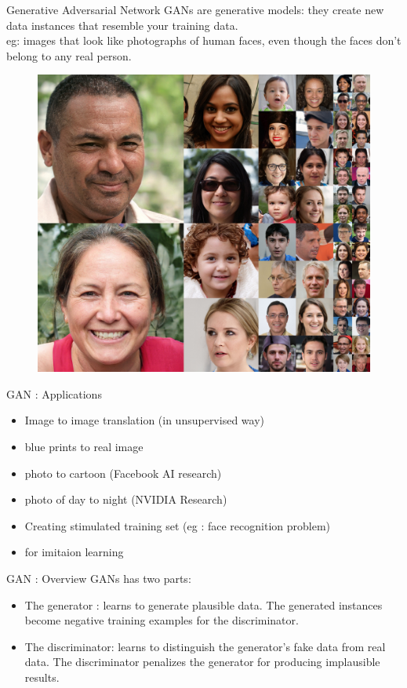

\begin{frame}[fragile]{Generative Adversarial Network}
 GANs are generative models: they create new data instances that resemble your training data. \\
 eg: images that look like photographs of human faces, even though the faces don't belong to any real person.
     \begin{figure}[ht]
      \hspace*{-1cm}\includegraphics[width=0.5\linewidth]{ganhumans} 

    \end{figure}
\end{frame}

\begin{frame}[fragile]{GAN : Applications}

    \begin{itemize}
        \item Image to image translation (in unsupervised way)
        \item blue prints to real image
        \item photo to cartoon (Facebook AI research)
        \item photo of day to night (NVIDIA Research)
        \item Creating stimulated training set (eg : face recognition problem)
        \item for imitaion learning
    \end{itemize}
\end{frame}

\begin{frame}[fragile]{GAN : Overview}
 GANs has two parts: \\
    \begin{itemize}
        \item The generator : learns to generate plausible data. The generated instances become negative training examples for the discriminator.

        \item The discriminator: learns to distinguish the generator's fake data from real data. The discriminator penalizes the generator for producing implausible results.
    \end{itemize}
\end{frame}


